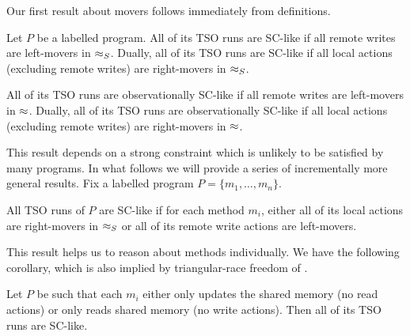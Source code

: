 \documentclass[preprint,9pt]{sigplanconf}
\begin{document}
Our first result about movers follows immediately from definitions.
\begin{lemma}
Let $P$ be a labelled program.
All of its TSO runs are SC-like if all remote writes are left-movers in $\approx_S$.
Dually, all of its TSO runs are SC-like if all local actions (excluding remote writes) are right-movers in $\approx_S$.

All of its TSO runs are observationally SC-like if all remote writes are left-movers in $\approx$.
Dually, all of its TSO runs are observationally SC-like if all local actions (excluding remote writes) are right-movers in $\approx$.
\end{lemma}
This result depends on a strong constraint which is unlikely to be satisfied by many programs.
In what follows we will provide a series of incrementally more general results.
Fix a labelled program $P=\{m_1,\ldots,m_n\}$.
\begin{lemma}
All TSO runs of $P$ are SC-like if for each method $m_i$, either all of its local actions are right-movers in $\approx_S$ or all of its remote write actions are left-movers. 
\end{lemma}
This result helps us to reason about methods individually.
We have the following corollary, which is also implied by triangular-race freedom of \cite{Owe2009}.
\begin{corollary}
Let $P$ be such that each $m_i$ either only updates the shared memory (no read actions) or only reads shared memory (no write actions).
Then all of its TSO runs are SC-like.
\end{corollary}
\end{document}
